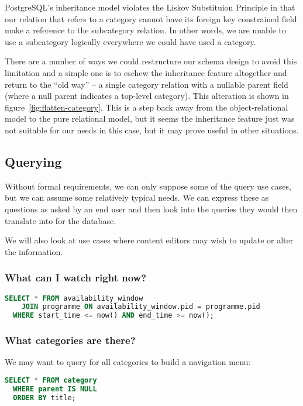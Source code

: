 \documentclass[11pt,a4paper]{article}
\begin{document}
PostgreSQL's inheritance model violates the Liskov Substituion Principle
in that our relation that refers to a category cannot have its foreign key
constrained field make a reference to the subcategory relation. In other
words, we are unable to use a subcategory logically everywhere we could
have used a category.

There are a number of ways we could restructure our schema design to
avoid this limitation and a simple one is to eschew the inheritance feature
altogether and return to the ``old way'' -- a single category relation
with a nullable parent field (where a null parent indicates a top-level
category). This alteration is shown in figure~\ref{fig:flatten-category}.
This is a step back away from the object-relational model to the pure
relational model, but it seems the inheritance feature just was not
suitable for our needs in this case, but it may prove useful in other
situations.

\subsection{Querying}

Without formal requirements, we can only
suppose some of the query use cases, but we can assume some relatively typical
needs. We can express these as questions as asked by an end user and then
look into the queries they would then translate into for the database.

We will also look at use cases where content editors may wish to update
or alter the information.

\subsubsection{What can I watch right now?}

\begin{lstlisting}[language=SQL]
  SELECT * FROM availability_window
    JOIN programme ON availability_window.pid = programme.pid
  WHERE start_time <= now() AND end_time >= now();
\end{lstlisting}

\subsubsection{What categories are there?}

We may want to query for all categories to build a navigation menu:

\begin{lstlisting}[language=SQL]
  SELECT * FROM category
  WHERE parent IS NULL
  ORDER BY title;
\end{lstlisting}
\end{document}
